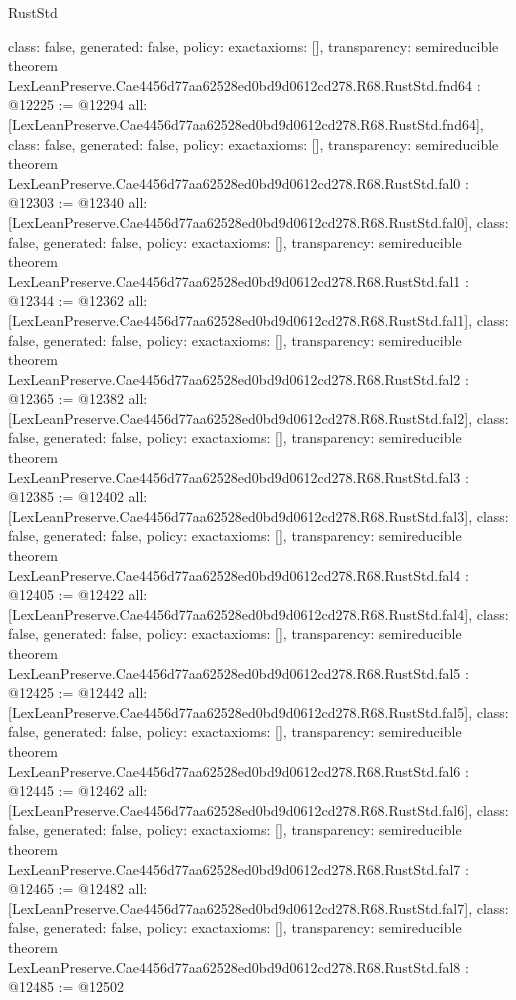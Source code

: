 \begin{lexlean}{RustStd}
\begin{coremodule}
{  class: false,
  generated: false,
  policy: exact{axioms: []},
  transparency: semireducible
}
theorem LexLeanPreserve.Cae4456d77aa62528ed0bd9d0612cd278.R68.RustStd.fnd64 : @12225 := @12294 {
  all: [LexLeanPreserve.Cae4456d77aa62528ed0bd9d0612cd278.R68.RustStd.fnd64],
  class: false,
  generated: false,
  policy: exact{axioms: []},
  transparency: semireducible
}
theorem LexLeanPreserve.Cae4456d77aa62528ed0bd9d0612cd278.R68.RustStd.fal0 : @12303 := @12340 {
  all: [LexLeanPreserve.Cae4456d77aa62528ed0bd9d0612cd278.R68.RustStd.fal0],
  class: false,
  generated: false,
  policy: exact{axioms: []},
  transparency: semireducible
}
theorem LexLeanPreserve.Cae4456d77aa62528ed0bd9d0612cd278.R68.RustStd.fal1 : @12344 := @12362 {
  all: [LexLeanPreserve.Cae4456d77aa62528ed0bd9d0612cd278.R68.RustStd.fal1],
  class: false,
  generated: false,
  policy: exact{axioms: []},
  transparency: semireducible
}
theorem LexLeanPreserve.Cae4456d77aa62528ed0bd9d0612cd278.R68.RustStd.fal2 : @12365 := @12382 {
  all: [LexLeanPreserve.Cae4456d77aa62528ed0bd9d0612cd278.R68.RustStd.fal2],
  class: false,
  generated: false,
  policy: exact{axioms: []},
  transparency: semireducible
}
theorem LexLeanPreserve.Cae4456d77aa62528ed0bd9d0612cd278.R68.RustStd.fal3 : @12385 := @12402 {
  all: [LexLeanPreserve.Cae4456d77aa62528ed0bd9d0612cd278.R68.RustStd.fal3],
  class: false,
  generated: false,
  policy: exact{axioms: []},
  transparency: semireducible
}
theorem LexLeanPreserve.Cae4456d77aa62528ed0bd9d0612cd278.R68.RustStd.fal4 : @12405 := @12422 {
  all: [LexLeanPreserve.Cae4456d77aa62528ed0bd9d0612cd278.R68.RustStd.fal4],
  class: false,
  generated: false,
  policy: exact{axioms: []},
  transparency: semireducible
}
theorem LexLeanPreserve.Cae4456d77aa62528ed0bd9d0612cd278.R68.RustStd.fal5 : @12425 := @12442 {
  all: [LexLeanPreserve.Cae4456d77aa62528ed0bd9d0612cd278.R68.RustStd.fal5],
  class: false,
  generated: false,
  policy: exact{axioms: []},
  transparency: semireducible
}
theorem LexLeanPreserve.Cae4456d77aa62528ed0bd9d0612cd278.R68.RustStd.fal6 : @12445 := @12462 {
  all: [LexLeanPreserve.Cae4456d77aa62528ed0bd9d0612cd278.R68.RustStd.fal6],
  class: false,
  generated: false,
  policy: exact{axioms: []},
  transparency: semireducible
}
theorem LexLeanPreserve.Cae4456d77aa62528ed0bd9d0612cd278.R68.RustStd.fal7 : @12465 := @12482 {
  all: [LexLeanPreserve.Cae4456d77aa62528ed0bd9d0612cd278.R68.RustStd.fal7],
  class: false,
  generated: false,
  policy: exact{axioms: []},
  transparency: semireducible
}
theorem LexLeanPreserve.Cae4456d77aa62528ed0bd9d0612cd278.R68.RustStd.fal8 : @12485 := @12502 {
}
\end{coremodule}
\end{lexlean}
